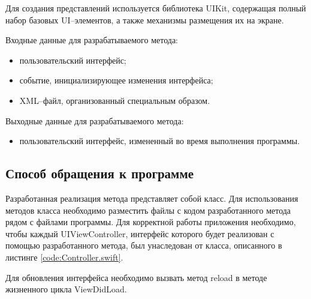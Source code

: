Для создания представлений используется библиотека UIKit, содержащая полный набор базовых UI--элементов, а также механизмы размещения их на экране. 

Входные данные для разрабатываемого метода:

\begin{itemize}[label=---]
	\item пользовательский интерфейс;
	\item событие, инициализирующее изменения интерфейса;
	\item XML--файл, организованный специальным образом.
\end{itemize}

Выходные данные для разрабатываемого метода:

\begin{itemize}[label=---]
	\item пользовательский интерфейс, измененный во время выполнения программы.
\end{itemize}

\subsection{Способ обращения к программе}

Разработанная реализация метода представляет собой класс.
Для использования методов класса необходимо разместить файлы с кодом разработанного метода рядом с файлами программы. 
Для корректной работы приложения необходимо, чтобы каждый UIViewController, интерфейс которого будет реализован с помощью разработанного метода, был унаследован от класса, описанного в листинге \ref{code:Controller.swift}. 


Для обновления интерфейса необходимо вызвать метод reload в методе жизненного цикла ViewDidLoad.

